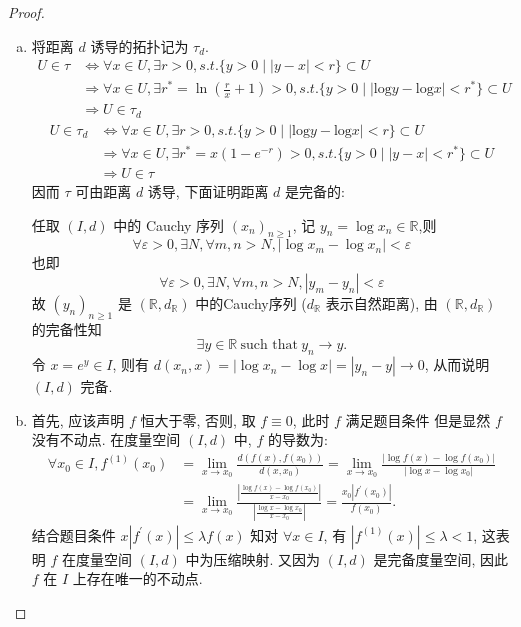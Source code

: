 \begin{proof}
  \begin{enumerate}[(a)]
    \item 将距离 $d$ 诱导的拓扑记为 $\tau _d$.
      \begin{align*}
          U\in\tau
        & \Leftrightarrow\forall x\in U,\exists r>0,s.t.\{y>0\mid|y-x|<r\}\subset U \\
        & \Rightarrow\forall x\in U,\exists r^{*}=\ln\left(\frac{r}{x}+1\right)>0,s.t.\{y>0\mid|\textrm{log}y-\textrm{log}x|<r^{*}\}\subset U \\
        & \Rightarrow U\in\tau _d
      \end{align*}
      \begin{align*}
        U\in\tau_d
        & \Leftrightarrow\forall x\in U,\exists r>0,
          s.t.\{y>0\mid|\textrm{log}y-\textrm{log}x|<r\}\subset U \\
        & \Rightarrow\forall x\in U,\exists r^{*}=x(1-e^{-r})>0,
          s.t.\{y>0\mid|y-x|<r^{*}\}\subset U \\
        & \Rightarrow U\in\tau
      \end{align*}
      因而 $\tau$ 可由距离 $d$ 诱导, 下面证明距离 $d$ 是完备的:

      任取 $(I,d)$ 中的 Cauchy 序列 $(x_n)_{n\geq 1}$, 记 $y_n=\log x_n\in\mathbb{R}$,则
      \[\forall\varepsilon >0,\exists N,\forall m,n>N,|\log x_m-\log x_n|<\varepsilon\]
      也即
      \[\forall\varepsilon >0,\exists N,\forall m,n>N,|y_m-y_n|<\varepsilon\]
      故 $(y_n)_{n\geq 1}$ 是 $(\mathbb{R},d_{\mathbb{R}})$ 中的Cauchy序列 ($d_{\mathbb{R}}$ 表示自然距离),
      由 $(\mathbb{R},d_{\mathbb{R}})$ 的完备性知
      \[\exists y\in\mathbb{R} \ \text{such that}\  y_n\rightarrow y.\]
      令 $x=e^y\in I$, 则有 $d(x_n,x)=|\log x_n-\log x|=|y_n-y|\rightarrow 0$,
      从而说明 $(I,d)$ 完备.
    \item 首先, 应该声明 $f$ 恒大于零, 否则, 取 $f\equiv 0$, 此时 $f$ 满足题目条件
      但是显然 $f$ 没有不动点.
      在度量空间 $(I,d)$ 中, $f$ 的导数为:
      \begin{align*}
          \forall x_0\in I,f^{(1)}(x_0)
          & =\lim_{x\to x_0}\frac{d(f(x),f(x_0))}{d(x,x_0)}=\lim_{x\to x_0}\frac{|\log f(x)-\log f(x_0)|}{|\log x-\log x_0|}\\
          & =\lim_{x\to x_0}\frac{\left|\frac{\log f(x)-\log f(x_0)}{x-x_0}\right|}{\left|\frac{\log x-\log x_0}{x-x_0}\right|}=\frac{x_0|f^{\prime}(x_0)|}{f(x_0)}.
      \end{align*}
      结合题目条件 $x|f^{\prime}(x)|\leq\lambda f(x)$
      知对 $\forall x\in I$, 有 $|f^{(1)}(x)|\leq\lambda<1$, 
      这表明 $f$ 在度量空间 $(I,d)$ 中为压缩映射.
      又因为 $(I,d)$ 是完备度量空间, 因此 $f$ 在 $I$ 上存在唯一的不动点.
  \end{enumerate}
\end{proof}



